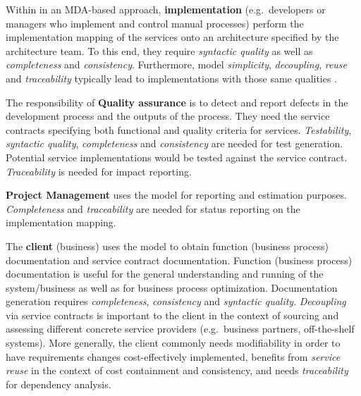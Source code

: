 Within in an MDA-based approach, {\bf implementation} (e.g.\ developers or managers who implement and control manual processes) perform the implementation mapping of the services onto an architecture specified by the architecture team. To this end, they require \emph{syntactic quality} as well as \emph{completeness} and \emph{consistency}. Furthermore, model \emph{simplicity}, \emph{decoupling}, \emph{reuse} and \emph{traceability} typically lead to implementations with those same qualities \cite{podgorelec_estimating_2007}.

The responsibility of {\bf Quality assurance} is to detect and report defects in the development process and the outputs of the process. They need the service contracts specifying both functional and quality criteria for services. \emph{Testability}, \emph{syntactic quality}, \emph{completeness} and \emph{consistency} are needed for test generation. Potential service implementations would be tested against the service contract. \emph{Traceability} is needed for impact reporting.

{\bf Project Management} uses the model for reporting and estimation purposes. \emph{Completeness} and \emph{traceability} are needed for status reporting on the implementation mapping.

The {\bf client} (business) uses the model to obtain function (business process) documentation and service contract documentation. Function (business process) documentation is useful for the general understanding and running of the system/business as well as for business process optimization. Documentation generation requires \emph{completeness}, \emph{consistency} and \emph{syntactic quality}. \emph{Decoupling} via service contracts is important to the client in the context of sourcing and assessing different concrete service providers (e.g.\ business partners, off-the-shelf systems). More generally, the client commonly needs modifiability in order to have requirements changes cost-effectively implemented, benefits from \emph{service reuse} in the context of cost containment and consistency, and needs \emph{traceability} for dependency analysis.

